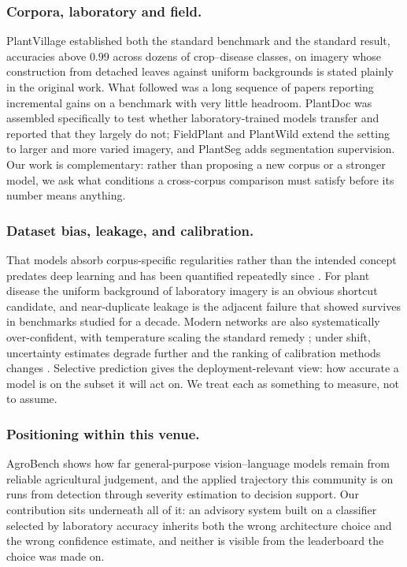 \documentclass[runningheads]{llncs}
\begin{document}
\subsubsection{Corpora, laboratory and field.}
PlantVillage \cite{mohanty2016plantvillage} established both the standard
benchmark and the standard result, accuracies above $0.99$ across dozens of
crop--disease classes, on imagery whose construction from detached leaves against
uniform backgrounds is stated plainly in the original work. What followed was a
long sequence of papers reporting incremental gains on a benchmark with very
little headroom. PlantDoc \cite{singh2020plantdoc} was assembled specifically to
test whether laboratory-trained models transfer and reported that they largely do
not; FieldPlant \cite{moupojou2023fieldplant} and PlantWild
\cite{wei2024plantwild} extend the setting to larger and more varied imagery, and
PlantSeg \cite{wei2025plantseg} adds segmentation supervision. Our work is
complementary: rather than proposing a new corpus or a stronger model, we ask
what conditions a cross-corpus comparison must satisfy before its number means
anything.

\subsubsection{Dataset bias, leakage, and calibration.}
That models absorb corpus-specific regularities rather than the intended concept
predates deep learning \cite{torralba2011bias} and has been quantified
repeatedly since \cite{recht2019imagenet,geirhos2020shortcut}. For plant disease
the uniform background of laboratory imagery is an obvious shortcut candidate,
and near-duplicate leakage is the adjacent failure that \cite{barz2020purging}
showed survives in benchmarks studied for a decade. Modern networks are also
systematically over-confident, with temperature scaling the standard remedy
\cite{guo2017calibration}; under shift, uncertainty estimates degrade further and
the ranking of calibration methods changes \cite{ovadia2019trust}. Selective
prediction \cite{geifman2017selective} gives the deployment-relevant view: how
accurate a model is on the subset it will act on. We treat each as something to
measure, not to assume.

\subsubsection{Positioning within this venue.}
AgroBench \cite{shinoda2025agrobench} shows how far general-purpose
vision--language models remain from reliable agricultural judgement, and the
applied trajectory this community is on runs from detection through severity
estimation to decision support. Our contribution sits underneath all of it: an
advisory system built on a classifier selected by laboratory accuracy inherits
both the wrong architecture choice and the wrong confidence estimate, and neither
is visible from the leaderboard the choice was made on.
\end{document}
